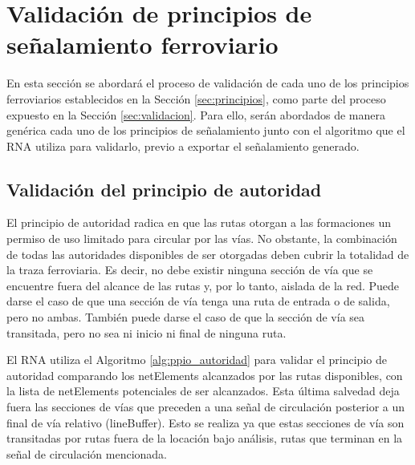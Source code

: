 \section{Validación de principios de señalamiento ferroviario}

				
	En esta sección se abordará el proceso de validación de cada uno de los principios ferroviarios establecidos en la Sección \ref{sec:principios}, como parte del proceso expuesto en la Sección \ref{sec:validacion}. Para ello, serán abordados de manera genérica cada uno de los principios de señalamiento junto con el algoritmo que el RNA utiliza para validarlo, previo a exportar el señalamiento generado.
	
	\subsection{Validación del principio de autoridad}
		
		El principio de autoridad radica en que las rutas otorgan a las formaciones un permiso de uso limitado para circular por las vías. No obstante, la combinación de todas las autoridades disponibles de ser otorgadas deben cubrir la totalidad de la traza ferroviaria. Es decir, no debe existir ninguna sección de vía que se encuentre fuera del alcance de las rutas y, por lo tanto, aislada de la red. Puede darse el caso de que una sección de vía tenga una ruta de entrada o de salida, pero no ambas. También puede darse el caso de que la sección de vía sea transitada, pero no sea ni inicio ni final de ninguna ruta.
		
		El RNA utiliza el Algoritmo \ref{alg:ppio_autoridad} para validar el principio de autoridad comparando los netElements alcanzados por las rutas disponibles, con la lista de netElements potenciales de ser alcanzados. Esta última salvedad deja fuera las secciones de vías que preceden a una señal de circulación posterior a un final de vía relativo (lineBuffer). Esto se realiza ya que estas secciones de vía son transitadas por rutas fuera de la locación bajo análisis, rutas que terminan en la señal de circulación mencionada.

